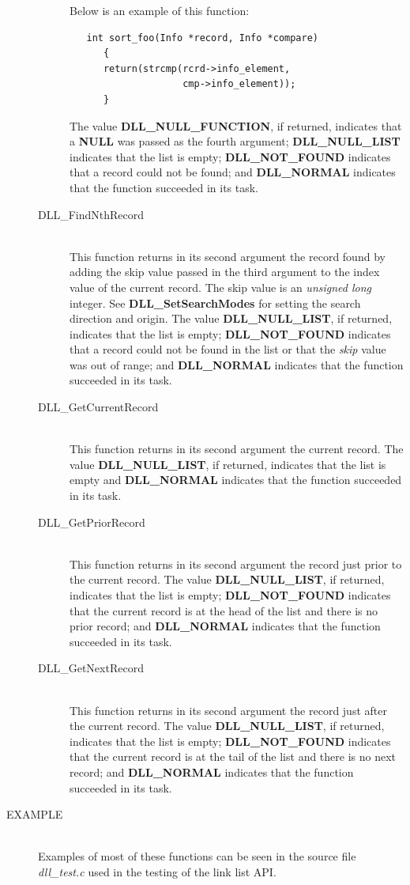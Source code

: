 \documentclass[10pt,letterpaper,titlepage]{article}
\begin{document}
\begin{description}
\begin{description}
 Below is an example of this function:

 \begin{verbatim}
   int sort_foo(Info *record, Info *compare)
      {
      return(strcmp(rcrd->info_element,
                    cmp->info_element));
      }

\end{verbatim}

  The value \textbf{DLL\_NULL\_FUNCTION}, if returned, indicates that a \textbf{NULL} was passed as the fourth argument; \textbf{DLL\_NULL\_LIST} indicates that the list is empty; \textbf{DLL\_NOT\_FOUND} indicates that a record could not be found; and \textbf{DLL\_NORMAL} indicates that the function succeeded in its task.

 \item[DLL\_FindNthRecord]\quad\\
 This function returns in its second argument the record found by adding the skip value passed in the third argument to the index value of the current record.  The skip value is an \emph{unsigned long} integer.  See \textbf{DLL\_SetSearchModes} for setting the search direction and origin.  The value \textbf{DLL\_NULL\_LIST}, if returned, indicates that the list is empty; \textbf{DLL\_NOT\_FOUND} indicates that a record could not be found in the list or that the \emph{skip} value was out of range; and \textbf{DLL\_NORMAL} indicates that the function succeeded in its task.

 \item[DLL\_GetCurrentRecord]\quad\\
 This function returns in its second argument the current record.  The value \textbf{DLL\_NULL\_LIST}, if returned, indicates that the list is empty and \textbf{DLL\_NORMAL} indicates that the function succeeded in its task.

 \item[DLL\_GetPriorRecord]\quad\\
 This function returns in its second argument the record just prior to the current record.  The value \textbf{DLL\_NULL\_LIST}, if returned, indicates that the list is empty; \textbf{DLL\_NOT\_FOUND} indicates that the current record is at the head of the list and there is no prior record; and \textbf{DLL\_NORMAL} indicates that the function succeeded in its task.

 \item[DLL\_GetNextRecord]\quad\\
 This function returns in its second argument the record just after the current record.  The value \textbf{DLL\_NULL\_LIST}, if returned, indicates that the list is empty; \textbf{DLL\_NOT\_FOUND} indicates that the current record is at the tail of the list and there is no next record; and \textbf{DLL\_NORMAL} indicates that the function succeeded in its task.
 \end{description}

\item[EXAMPLE]\quad\\
Examples of most of these functions can be seen in the source file \emph{dll\_test.c} used in the testing of the link list API.

\end{description}
\end{document}
